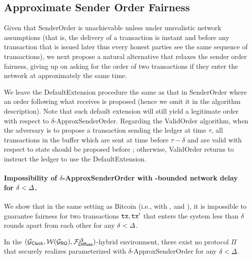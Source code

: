 \subsection{Approximate Sender Order Fairness}
\label{subsec:approximate-order-fairness}

Given that \textsf{SenderOrder} is unachievable unless under unrealistic network assumptions (that is, the delivery of a transaction is instant and before any transaction that is issued later thus every honest parties see the same sequence of transactions), we next propose a natural alternative that relaxes the sender order fairness, giving up on asking for the order of two transactions if they enter the network at approximately the same time.

We leave the \textsf{DefaultExtension} procedure the same as that in \textsf{SenderOrder} where an order following what \funcFairLedger receives is proposed (hence we omit it in the algorithm description).
%
Note that such default extension will still yield a legitimate order with  respect to $\delta$-\textsf{ApproxSenderOrder}.
%
Regarding the \textsf{ValidOrder} algorithm, when the adversary is to propose a transaction \tx sending the ledger at time $\tau$, all transactions in the buffer which are sent at time before $\tau - \delta$ and are valid with respect to state should be proposed before \tx; otherwise, \textsf{ValidOrder} returns \false to instruct the ledger to use the \textsf{DefaultExtension}.



\paragraph{Impossibility of $\delta$-\textsf{ApproxSenderOrder} with \delay-bounded network delay for $\delta < \varDelta$.}
%
We show that in the same setting as Bitcoin (i.e., with \funcClock, \wrapper{\funcGRO} and \funcDiffuse), it is impossible to guarantee fairness for two transactions $\mathtt{tx}, \mathtt{tx}'$ that enters the system less than $\delta$ rounds apart from each other for any $\delta < \varDelta$.

\begin{theorem} \label{thm:impossibility-bitcoin-setting}
	In the $(\mathcal{G}_{\mathsf{Clock}}, \mathcal{W}(\mathcal{G}_{\mathsf{RO}}), \mathcal{F}_{\mathsf{Diffuse}}^\varDelta)$-hybrid environment, there exist no protocol $\Pi$ that securely realizes \funcFairLedger parameterized with $\delta$-\textsf{ApproxSenderOrder} for any $\delta < \varDelta$.
\end{theorem}

